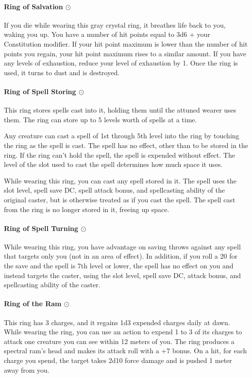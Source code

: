     \paragraph{Ring of Salvation $\odot$}
        If you die while wearing this gray crystal ring, it breathes life back to you, waking you up.
        You have a number of hit points equal to 3d6 + your Constitution modifier.
        If your hit point maximum is lower than the number of hit points you regain, your hit point maximum rises to a similar amount.
        If you have any levels of exhaustion, reduce your level of exhaustion by 1.
        Once the ring is used, it turns to dust and is destroyed.
    \paragraph{Ring of Spell Storing $\odot$}
        This ring stores spells cast into it, holding them until the attuned wearer uses them.
        The ring can store up to 5 levels worth of spells at a time.

        Any creature can cast a spell of 1st through 5th level into the ring by touching the ring as the spell is cast.
        The spell has no effect, other than to be stored in the ring.
        If the ring can't hold the spell, the spell is expended without effect.
        The level of the slot used to cast the spell determines how much space it uses.

        While wearing this ring, you can cast any spell stored in it.
        The spell uses the slot level, spell save DC, spell attack bonus, and spellcasting ability of the original caster, but is otherwise treated as if you cast the spell.
        The spell cast from the ring is no longer stored in it, freeing up space.
    \paragraph{Ring of Spell Turning $\odot$}
        While wearing this ring, you have advantage on saving throws against any spell that targets only you (not in an area of effect).
        In addition, if you roll a 20 for the save and the spell is 7th level or lower, the spell has no effect on you and instead targets the caster, using the slot level, spell save DC, attack bonus, and spellcasting ability of the caster.
    \paragraph{Ring of the Ram $\odot$}
        This ring has 3 charges, and it regains 1d3 expended charges daily at dawn.
        While wearing the ring, you can use an action to expend 1 to 3 of its charges to attack one creature you can see within 12 meters of you.
        The ring produces a spectral ram's head and makes its attack roll with a +7 bonus.
        On a hit, for each charge you spend, the target takes 2d10 force damage and is pushed 1 meter away from you.

